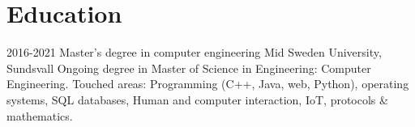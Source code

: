 \section{Education}



\begin{entrylist}
  \entry
    {2016-2021}
    {Master's degree in computer engineering}
    {Mid Sweden University, Sundsvall}
    {%
      Ongoing degree in Master of Science in Engineering: Computer\\Engineering. Touched areas: Programming (C++, Java, web, Python), operating systems, SQL databases, Human and computer interaction, IoT, protocols \& mathematics.
      }
\end{entrylist}
